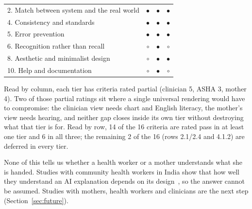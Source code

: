 \begin{table}[t]
\begin{tabular}{lccc}
2. Match between system and the real world   & $\bullet$ & $\bullet$ & $\bullet$ \\
4. Consistency and standards                 & $\bullet$ & $\bullet$ & $\bullet$ \\
5. Error prevention                          & $\bullet$ & $\bullet$ & $\bullet$ \\
6. Recognition rather than recall            & $\circ$ & $\bullet$ & $\circ$ \\
8. Aesthetic and minimalist design           & $\circ$ & $\bullet$ & $\bullet$ \\
10. Help and documentation                   & $\circ$ & $\bullet$ & $\circ$ \\
\bottomrule
\end{tabular}
\end{table}

Read by column, each tier has criteria rated partial (clinician 5, ASHA 3,
mother 4). Two of those partial ratings sit
where a single universal rendering would have to compromise: the clinician
view needs chart and English literacy, the mother's view needs hearing, and
neither gap closes inside its own tier without destroying what that tier is
for. Read by row, 14 of the 16 criteria are rated pass in at least one tier
and 6 in all three; the remaining 2 of the 16 (rows 2.1/2.4 and 4.1.2) are
deferred in every tier.

None of this tells us whether a health worker or a mother understands what
she is handed. Studies with community health workers in India show that how
well they understand an AI explanation depends on its
design~\citep{okolo2024easy,solanokamaiko2024explorable}, so the answer cannot
be assumed. Studies with mothers, health workers and clinicians are the next
step (Section~\ref{sec:future}).
